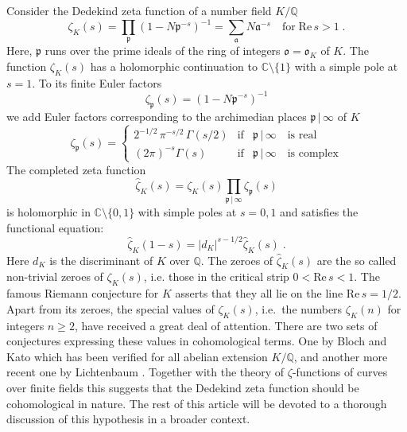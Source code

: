\documentclass[11pt,leqno]{article}
\newcommand{\C}{{\mathbb{C}}}
\newcommand{\Q}{{\mathbb{Q}}}
\newcommand{\RRe}{\mathrm{Re}\,}
\newcommand{\ea}{\mathfrak{a}}
\newcommand{\eo}{\mathfrak{o}}
\newcommand{\ep}{\mathfrak{p}}
\newcommand{\tei}{\, | \,}
\begin{document}
Consider the Dedekind zeta function of a number field $K / \Q$
\[
\zeta_K (s) = \prod_{\ep} (1 - N\ep^{-s})^{-1} = \sum_{\ea} N \ea^{-s} \quad \mbox{for} \; \RRe s > 1 \; .
\]
Here, $\ep$ runs over the prime ideals of the ring of integers $\eo = \eo_K$ of $K$. 
The function $\zeta_K (s)$ has a holomorphic continuation to $\C \setminus \{ 1 \}$ with a simple pole at $s =1$. To its finite Euler factors
\[
\zeta_{\ep} (s) = (1 - N\ep^{-s})^{-1}
\]
we add Euler factors corresponding to the archimedian places $\ep \tei \infty$ of $K$
\[
\zeta_{\ep} (s) = \left\{ \begin{array}{ccl}
 2^{-1/2} \, \pi^{-s/2} \, \Gamma (s / 2) & \mbox{if} & \ep \tei \infty \quad \mbox{is real} \\
(2 \pi)^{-s} \Gamma (s) & \mbox{if} & \ep \tei \infty \quad \mbox{is complex}
\end{array} \right.
\]
The completed zeta function
\[
\hat{\zeta}_K (s) = \zeta_K (s) \prod_{\ep \tei \infty} \zeta_{\ep} (s)
\]
is holomorphic in $\C \setminus \{ 0,1 \}$ with simple poles at $s = 0,1$ and satisfies the functional equation:
\[
\hat{\zeta}_K (1-s) = |d_K|^{s- 1/2} \hat{\zeta}_K (s) \; .
\]
Here $d_K$ is the discriminant of $K$ over $\Q$. The zeroes of $\hat{\zeta}_K (s)$ are the so called non-trivial zeroes of $\zeta_K (s)$, i.e. those in the critical strip $0 < \RRe s < 1$. The famous Riemann conjecture for $K$ asserts that they all lie on the line $\RRe s = 1/2$. \\
Apart from its zeroes, the special values of $\zeta_K (s)$, i.e.\ the numbers $\zeta_K (n)$ for integers $n  \ge 2$, have received a great deal of attention. 
There are two sets of conjectures expressing these values in cohomological terms. One by Bloch and Kato \cite{BK} which has been verified for all abelian extension $K / \Q$, and another more recent one by Lichtenbaum \cite{Li}. Together with the theory of $\zeta$-functions of curves over finite fields this suggests that the Dedekind zeta function should be cohomological in nature. The rest of this article will be devoted to a thorough discussion of this hypothesis in a broader context.
\end{document}
